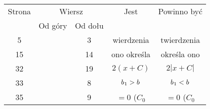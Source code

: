 \documentclass[a4paper,11pt]{article}
\numberwithin{equation}{section}
\begin{document}
\newpage



\begin{center}

  \begin{tabular}{|c|c|c|c|c|}
    \hline
    Strona & \multicolumn{2}{c|}{Wiersz} & Jest
                              & Powinno być \\ \cline{2-3}
    & Od góry & Od dołu & & \\
    \hline
    \hphantom{0}5 & & \hphantom{0}3 & wierdzenia & twierdzenia \\
    15  & & 14 & ono określa & określa ono \\
    32  & & 19 & $2 ( x + C )$ & $2 | x + C |$ \\
    33  & & \hphantom{0}8
                              & $b_{ \hspace{0.05em} 1 } > b$
    & $b_{ \hspace{0.05em} 1 } < b$ \\
    35  & & \hphantom{0}9 & $= 0$ \hspace{0.5em} ($C_{ 0 }$
    & $= 0$ ($C_{ 0 }$ \\
    \hline
  \end{tabular}

\end{center}

\VerSpaceSix
\end{document}
